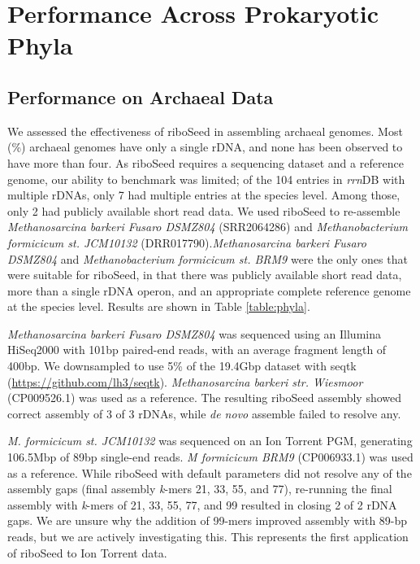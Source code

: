 \section*{Performance Across Prokaryotic Phyla}
\subsection*{Performance on Archaeal Data}

We assessed the effectiveness of riboSeed in assembling archaeal genomes. Most (\%) archaeal genomes have only a single rDNA, and none has been observed to have more than four. As riboSeed requires a sequencing dataset and a reference genome, our ability to benchmark was limited; of the 104 entries in \textit{rrn}DB with multiple rDNAs, only 7 had multiple entries at the species level. Among those, only 2 had publicly available short read data. We used riboSeed to re-assemble \textit{Methanosarcina barkeri Fusaro DSMZ804} (SRR2064286) and \textit{Methanobacterium formicicum st. JCM10132} (DRR017790).\textit{Methanosarcina barkeri Fusaro DSMZ804} and  \textit{Methanobacterium formicicum st. BRM9}  were the only ones that were suitable for riboSeed, in that there was publicly available short read data, more than a single rDNA operon, and an appropriate complete reference genome at the species level.  Results are shown in Table \ref{table:phyla}.

\textit{Methanosarcina barkeri Fusaro DSMZ804} was sequenced using an Illumina HiSeq2000 with 101bp paired-end reads, with an average fragment length of 400bp. We downsampled to use 5\% of the 19.4Gbp dataset with seqtk (\href{https://github.com/lh3/seqtk}{https://github.com/lh3/seqtk}). \textit{Methanosarcina barkeri str. Wiesmoor} (CP009526.1) was used as a reference. The resulting riboSeed assembly showed correct assembly of 3 of 3 rDNAs, while \textit{de novo} assemble failed to resolve any.

\textit{M. formicicum st. JCM10132} was sequenced on an Ion Torrent PGM, generating 106.5Mbp of 89bp single-end reads. \textit{M formicicum BRM9} (CP006933.1) was used as a reference. While riboSeed with default parameters did not resolve any of the assembly gaps (final assembly \textit{k}-mers 21, 33, 55, and 77), re-running the final assembly with \textit{k}-mers of 21, 33, 55, 77, and 99 resulted in closing 2 of 2 rDNA gaps. We are unsure why the addition of 99-mers improved assembly with 89-bp reads, but we are actively investigating this. This represents the first application of riboSeed to Ion Torrent data.

